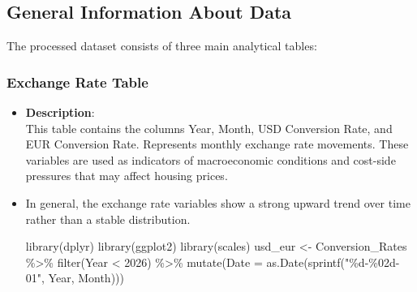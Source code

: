 \documentclass[
  11pt,
  a4paper,
]{article}
\newenvironment{Shaded}{\begin{snugshade}}{\end{snugshade}}
\newcommand{\AttributeTok}[1]{\textcolor[rgb]{0.40,0.45,0.13}{#1}}
\newcommand{\DecValTok}[1]{\textcolor[rgb]{0.68,0.00,0.00}{#1}}
\newcommand{\FunctionTok}[1]{\textcolor[rgb]{0.28,0.35,0.67}{#1}}
\newcommand{\NormalTok}[1]{\textcolor[rgb]{0.00,0.23,0.31}{#1}}
\newcommand{\OtherTok}[1]{\textcolor[rgb]{0.00,0.23,0.31}{#1}}
\newcommand{\SpecialCharTok}[1]{\textcolor[rgb]{0.37,0.37,0.37}{#1}}
\newcommand{\StringTok}[1]{\textcolor[rgb]{0.13,0.47,0.30}{#1}}
\begin{document}
\subsection{General Information About
Data}\label{general-information-about-data}

The processed dataset consists of three main analytical tables:

\subsubsection{Exchange Rate Table}\label{exchange-rate-table}

\begin{itemize}
\item
  \textbf{Description}:\\
  This table contains the columns Year, Month, USD Conversion Rate, and
  EUR Conversion Rate. Represents monthly exchange rate movements. These
  variables are used as indicators of macroeconomic conditions and
  cost-side pressures that may affect housing prices.
\item
  In general, the exchange rate variables show a strong upward trend
  over time rather than a stable distribution.

\begin{Shaded}
\begin{Highlighting}[]
\FunctionTok{library}\NormalTok{(dplyr)}
\FunctionTok{library}\NormalTok{(ggplot2)}
\FunctionTok{library}\NormalTok{(scales)}
\NormalTok{usd\_eur }\OtherTok{\textless{}{-}}\NormalTok{ Conversion\_Rates }\SpecialCharTok{\%\textgreater{}\%}
  \FunctionTok{filter}\NormalTok{(Year }\SpecialCharTok{\textless{}} \DecValTok{2026}\NormalTok{) }\SpecialCharTok{\%\textgreater{}\%}
  \FunctionTok{mutate}\NormalTok{(}\AttributeTok{Date =} \FunctionTok{as.Date}\NormalTok{(}\FunctionTok{sprintf}\NormalTok{(}\StringTok{"\%d{-}\%02d{-}01"}\NormalTok{, Year, Month)))}


\end{Highlighting}
\end{Shaded}
\end{itemize}
\end{document}

